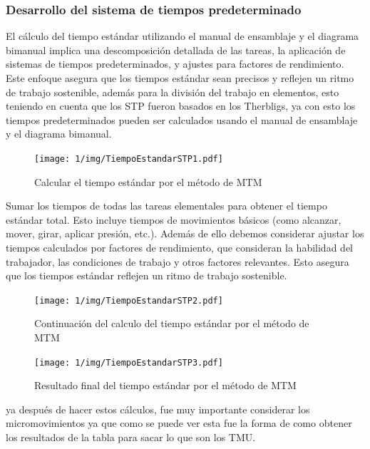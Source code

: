     \subsubsection{Desarrollo del sistema de tiempos predeterminado}
    El cálculo del tiempo estándar utilizando el manual de ensamblaje y el diagrama bimanual implica una descomposición detallada de las tareas, la aplicación de sistemas de tiempos predeterminados, y ajustes para factores de rendimiento. Este enfoque asegura que los tiempos estándar sean precisos y reflejen un ritmo de trabajo sostenible, además para la división del trabajo en elementos, esto teniendo en cuenta que los STP fueron basados en los Therbligs, ya con esto los tiempos predeterminados pueden ser calculados usando el manual de ensamblaje y el diagrama bimanual.
     \begin{figure}[H]
            \centering
            \texttt{[image: 1/img/TiempoEstandarSTP1.pdf]}
            \caption{Calcular el tiempo estándar por el método de MTM}
            \label{fig:TiempoEstandarSTP1}
        \end{figure}
    Sumar los tiempos de todas las tareas elementales para obtener el tiempo estándar total. Esto incluye tiempos de movimientos básicos (como alcanzar, mover, girar, aplicar presión, etc.).
    Además de ello debemos considerar ajustar los tiempos calculados por factores de rendimiento, que consideran la habilidad del trabajador, las condiciones de trabajo y otros factores relevantes. Esto asegura que los tiempos estándar reflejen un ritmo de trabajo sostenible.
        \begin{figure}[H]
            \centering
            \texttt{[image: 1/img/TiempoEstandarSTP2.pdf]}
            \caption{Continuación del calculo del tiempo estándar por el método de MTM}
            \label{fig:TiempoEstandarSTP2}
        \end{figure}
        
        \begin{figure}[H]
            \centering
            \texttt{[image: 1/img/TiempoEstandarSTP3.pdf]}
            \caption{Resultado final del tiempo estándar por el método de MTM}
            \label{fig:TiempoEstandarSTP3}
        \end{figure}
    ya después de hacer estos cálculos, fue muy importante considerar los micromovimientos ya que como se puede ver esta fue la forma de como obtener los resultados de la tabla para sacar lo que son los TMU.
    
